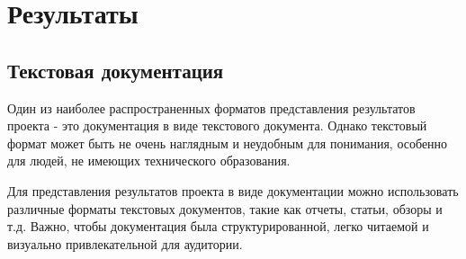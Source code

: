 \chapter{Результаты}
\label{ch:results}

\section{Текстовая документация}
Один из наиболее распространенных форматов представления результатов проекта - это документация в виде текстового документа. Однако текстовый формат может быть не очень наглядным и неудобным для понимания, особенно для людей, не имеющих технического образования.

Для представления результатов проекта в виде документации можно использовать различные форматы текстовых документов, такие как отчеты, статьи, обзоры и т.д. Важно, чтобы документация была структурированной, легко читаемой и визуально привлекательной для аудитории.

